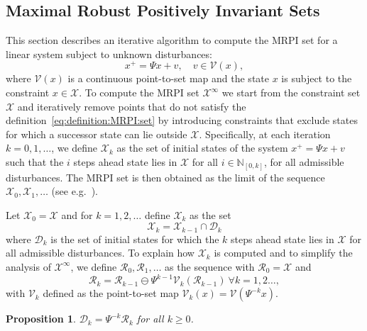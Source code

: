 \documentclass[journal]{IEEEtran}
\newcounter{thmcount}
\newtheorem{prop}[thmcount]{Proposition}
\theoremstyle{remark}
\theoremstyle{definition}
\begin{document}
\subsection{Maximal Robust Positively Invariant Sets}\label{ssec:MRPI:sets}
%
This section describes an iterative algorithm to compute the MRPI set for a linear system subject to unknown disturbances:
\[
x^+=\Psi x + v, \quad v\in\mathcal V(x),
\]
where $\mathcal V(x)$ is a continuous point-to-set map and the state $x$ is subject to the constraint $x\in\mathcal{X}$. 
%
To compute the MRPI set $\mathcal X^\infty$ we start from the constraint set $\mathcal X$ and  iteratively remove points that do not satisfy the definition~\eqref{eq:definition:MRPI:set}
by introducing constraints that exclude states for which a successor state can lie outside 
$\mathcal X$. 
%
Specifically, at each iteration $k=0,1,\ldots$, we define $\mathcal{X}_k$ as the set of initial states of the system $x^+=\Psi x + v$ such that the $i$ steps ahead state lies in $\mathcal{X}$ for all $i\in\mathbb{N}_{[0,k]}$, for all admissible disturbances. 
%
The MRPI set is then obtained as the limit of the sequence $\mathcal{X}_0,\mathcal{X}_1,\ldots$ (see e.g.~\cite{blanchini:2007}).

Let $\mathcal{X}_0=\mathcal{X}$ and for $k=1,2,\ldots$ define $\mathcal{X}_k$ as the set
\begin{equation}\label{eq:Xk:iteration}
\mathcal{X}_k = \mathcal{X}_{k-1}\cap \mathcal{D}_k 
\end{equation} 
where $\mathcal{D}_k$ is the set of initial states for which the $k$ steps ahead state lies in $\mathcal{X}$ for all admissible disturbances.
%
To explain how $\mathcal{X}_k$ is computed and to simplify the analysis of $\mathcal{X}^\infty$, we define $\mathcal{R}_0,\mathcal{R}_1,\ldots$ as the sequence with $\mathcal{R}_0 = \mathcal{X}$ and
\begin{equation}\label{eq:Rk:iteration}
\mathcal{R}_k = \mathcal{R}_{k-1}\ominus \Psi^{k-1} \mathcal{V}_k(\mathcal{R}_{k-1}) \ \forall k=1,2\ldots,
\end{equation} 
with $\mathcal{V}_k$ defined as the point-to-set map $\mathcal{V}_k(x) = \mathcal{V}(\Psi^{-k} x)$.%

\begin{prop}\label{prop:Dk:iteration}
$\mathcal{D}_k = \Psi^{-k}\mathcal{R}_k$ for all $k\geq 0$.
\end{prop}%
\end{document}
